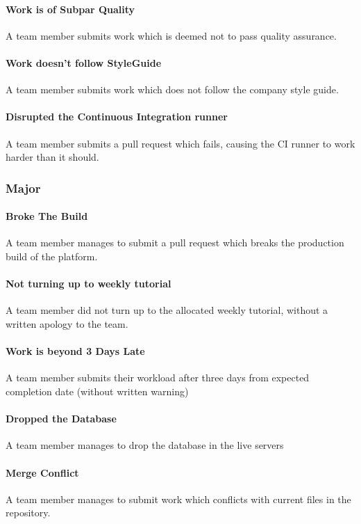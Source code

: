 \documentclass[12pt, a4paper, onecolumn]{article}
\begin{document}
\paragraph{Work is of Subpar Quality}
A team member submits work which is deemed not to pass quality assurance.

\paragraph{Work doesn't follow StyleGuide}
A team member submits work which does not follow the company style guide.

\paragraph{Disrupted the Continuous Integration runner}
A team member submits a pull request which fails, causing the CI runner
to work harder than it should.

\subsubsection{Major}
\paragraph{Broke The Build}
A team member manages to submit a pull request which breaks the production
build of the platform.

\paragraph{Not turning up to weekly tutorial}
A team member did not turn up to the allocated weekly tutorial, without
a written apology to the team.

\paragraph{Work is beyond 3 Days Late}
A team member submits their workload after three days
from expected completion date (without written warning)

\paragraph{Dropped the Database}
A team member manages to drop the database in the live
servers

\paragraph{Merge Conflict}
A team member manages to submit work which conflicts
with current files in the repository.
\end{document}
